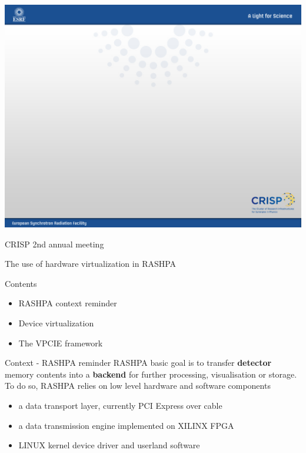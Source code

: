\documentclass{beamer}
\begin{document}
\usebackgroundtemplate
{
\includegraphics[height=\paperheight,width=\paperwidth]{pic/esrf_crisp/esrf_crisp_default.jpeg}
}

\begin{frame}{CRISP 2nd annual meeting}
\begin{center}
The use of hardware virtualization in RASHPA
\end{center}
\end{frame}

\begin{frame}{Contents}
  \begin{itemize}
  \item RASHPA context reminder
  \item Device virtualization
  \item The VPCIE framework
  \end{itemize}
\end{frame}

\begin{frame}{Context - RASHPA reminder}
  RASHPA basic goal is to transfer \textbf{detector} memory contents into
  a \textbf{backend} for further processing, visualisation or storage. To
  do so, RASHPA relies on low level hardware and software components\\
  \begin{itemize}
  \item a data transport layer, currently PCI Express over cable
  \item a data transmission engine implemented on XILINX FPGA
  \item LINUX kernel device driver and userland software
  \end{itemize}
\end{frame}
\end{document}
